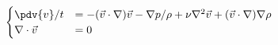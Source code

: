 \begin{equation}\label{eq:inse_sys}
\begin{cases}
  \pdv{v}/{t} &=
      - (\vec{v} \cdot \nabla)\vec{v}
      - \nabla{p} / \rho
      + \nu \nabla^2\vec{v}
          + (\vec{v} \cdot \nabla)\nabla\rho
  \\
  \nabla \cdot \vec{v} &= 0
\end{cases}
\end{equation}
